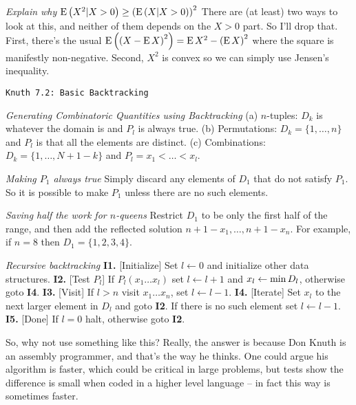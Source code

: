  {\it Explain why ${\rm E}\left(X^2 | X > 0\right) \geq 
\left({\rm E} \left(X | X > 0\right)\right)^2$}\hfil\break
There are (at least) two ways to look at this, and neither of them depends on the $X > 0$
part.  So I'll drop that.  First, there's the usual ${\rm E}\left( \left(X - {\rm E} \, X\right)^2 \right) =
{\rm E} \, X^2 - \left({\rm E}\, X\right)^2$ where the square is manifestly non-negative.
Second, $X^2$ is convex so we can simply use Jensen's inequality.

\topglue 0.5in
\centerline{\tt Knuth 7.2: Basic Backtracking}
\vskip 0.3in

 {\it Generating Combinatoric Quantities using 
Backtracking}\hfil\break
(a) $n$-tuples: $D_k$ is whatever the domain is and $P_l$ is always 
true.\hfil\break 
(b) Permutations: $D_k = \{ 1, \ldots, n \}$ and $P_l$ is that all the elements 
are distinct.\hfil\break
(c) Combinations: $D_k = \{1, \ldots, N + 1 - k \}$ and 
$P_l = x_1 < \ldots < x_l$.\hfil\break

 {\it Making $P_1$ always true}\hfil\break
Simply discard any elements of $D_1$ that do not satisfy $P_1$.
So it is possible to make $P_1$ unless there are no such elements.

 {\it Saving half the work for $n$-queens}\hfil\break
Restrict $D_1$ to be only the first half of the range, and then add the 
reflected solution $n + 1 - x_1, \ldots, n + 1 - x_n$.  For example, if $n = 8$
then $D_1 = \{1, 2, 3, 4\}$.

 {\it Recursive backtracking}\hfil\break
{\bf I1.} [Initialize] Set $l \leftarrow 0$ and initialize other data 
structures.\hfil\break
{\bf I2.} [Test $P_l$] If $P_l\left(x_1 \ldots x_l\right)$ set 
 $l \leftarrow l + 1$ and $x_l \leftarrow {\rm min}\,D_l$,
  otherwise goto {\bf I4}.\hfil\break 
{\bf I3.} [Visit] If $l > n$ visit $x_1 \ldots x_n$, set $l \leftarrow l-1$.
\hfil\break
{\bf I4.} [Iterate] Set $x_l$ to the next larger element in $D_l$ and goto 
 {\bf I2}. If there is no such element set $l \leftarrow l - 1$.\hfil\break
{\bf I5.} [Done] If $l=0$ halt, otherwise goto {\bf I2}.
\hfil\break

So, why not use something like this?  Really, the answer is because Don Knuth
is an assembly programmer, and that's the way he thinks.  One could argue his
algorithm is faster, which could be critical in large problems, but tests show
the difference is small when coded in a higher level language -- in fact this
way is sometimes faster.

